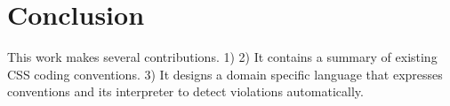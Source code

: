 \documentclass[parskip=full]{uvamscse}
\begin{document}

\chapter{Conclusion}

This work makes several contributions. 1) 2) It contains a summary of existing
CSS coding conventions. 3) It designs a domain specific language that expresses
conventions and its interpreter to detect violations automatically.

{%


}
\end{document}
